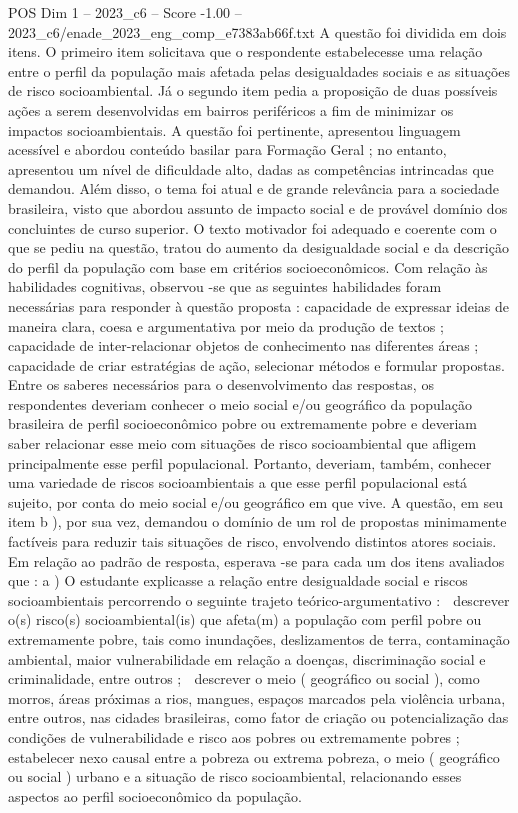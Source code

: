 \begin{textsample}{POS Dim 1 – 2023\_c6 – Score -1.00 – 2023\_c6/enade\_2023\_eng\_comp\_e7383ab66f.txt}
A questão foi dividida em dois itens.
O primeiro item solicitava que o respondente estabelecesse uma relação entre o perfil da população mais afetada pelas desigualdades sociais e as situações de risco socioambiental.
Já o segundo item pedia a proposição de duas possíveis ações a serem desenvolvidas em bairros periféricos a fim de minimizar os impactos socioambientais.
A questão foi pertinente, apresentou linguagem acessível e abordou conteúdo basilar para Formação Geral ; no entanto, apresentou um nível de dificuldade alto, dadas as competências intrincadas que demandou.
Além disso, o tema foi atual e de grande relevância para a sociedade brasileira, visto que abordou assunto de impacto social e de provável domínio dos concluintes de curso superior.
O texto motivador foi adequado e coerente com o que se pediu na questão, tratou do aumento da desigualdade social e da descrição do perfil da população com base em critérios socioeconômicos.
Com relação às habilidades cognitivas, observou -se que as seguintes habilidades foram necessárias para responder à questão proposta : capacidade de expressar ideias de maneira clara, coesa e argumentativa por meio da produção de textos ; capacidade de inter-relacionar objetos de conhecimento nas diferentes áreas ; capacidade de criar estratégias de ação, selecionar métodos e formular propostas.
Entre os saberes necessários para o desenvolvimento das respostas, os respondentes deveriam conhecer o meio social e/ou geográfico da população brasileira de perfil socioeconômico pobre ou extremamente pobre e deveriam saber relacionar esse meio com situações de risco socioambiental que afligem principalmente esse perfil populacional.
Portanto, deveriam, também, conhecer uma variedade de riscos socioambientais a que esse perfil populacional está sujeito, por conta do meio social e/ou geográfico em que vive.
A questão, em seu item b ), por sua vez, demandou o domínio de um rol de propostas minimamente factíveis para reduzir tais situações de risco, envolvendo distintos atores sociais.
Em relação ao padrão de resposta, esperava -se para cada um dos itens avaliados que : a ) O estudante explicasse a relação entre desigualdade social e riscos socioambientais percorrendo o seguinte trajeto teórico-argumentativo :  descrever o(s) risco(s) socioambiental(is) que afeta(m) a população com perfil pobre ou extremamente pobre, tais como inundações, deslizamentos de terra, contaminação ambiental, maior vulnerabilidade em relação a doenças, discriminação social e criminalidade, entre outros ;  descrever o meio ( geográfico ou social ), como morros, áreas próximas a rios, mangues, espaços marcados pela violência urbana, entre outros, nas cidades brasileiras, como fator de criação ou potencialização das condições de vulnerabilidade e risco aos pobres ou extremamente pobres ;  estabelecer nexo causal entre a pobreza ou extrema pobreza, o meio ( geográfico ou social ) urbano e a situação de risco socioambiental, relacionando esses aspectos ao perfil socioeconômico da população.

\end{textsample}
